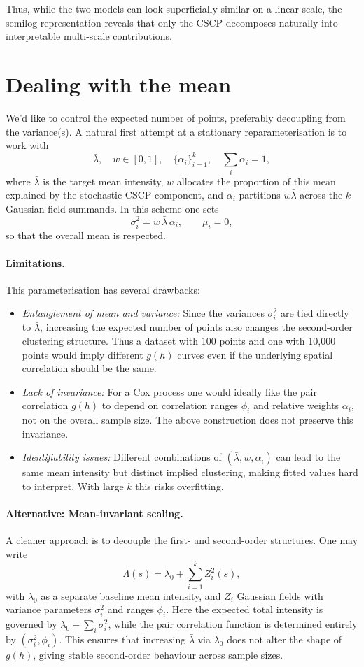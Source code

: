 \documentclass[11pt]{article}
\begin{document}
Thus, while the two models can look superficially similar on a linear scale, the semilog representation reveals that only the CSCP decomposes naturally into interpretable multi-scale contributions.


\section{Dealing with the mean}
We'd like to control the expected number of points, preferably decoupling from the variance(s). A natural first attempt at a stationary reparameterisation is to work with
\[
\bar\lambda, \quad w \in [0,1], \quad \{\alpha_i\}_{i=1}^k, \quad \sum_i \alpha_i = 1,
\]
where $\bar\lambda$ is the target mean intensity, $w$ allocates the proportion of this mean explained by the stochastic CSCP component, and $\alpha_i$ partitions $w\bar\lambda$ across the $k$ Gaussian-field summands.  In this scheme one sets
\[
\sigma_i^2 = w \, \bar\lambda \, \alpha_i, 
\qquad \mu_i = 0,
\]
so that the overall mean is respected.

\paragraph{Limitations.}
This parameterisation has several drawbacks:
\begin{itemize}
	\item \emph{Entanglement of mean and variance:} Since the variances $\sigma_i^2$ are tied directly to $\bar\lambda$, increasing the expected number of points also changes the second-order clustering structure. Thus a dataset with 100 points and one with 10{,}000 points would imply different $g(h)$ curves even if the underlying spatial correlation should be the same.
	\item \emph{Lack of invariance:} For a Cox process one would ideally like the pair correlation $g(h)$ to depend on correlation ranges $\phi_i$ and relative weights $\alpha_i$, not on the overall sample size. The above construction does not preserve this invariance.
	\item \emph{Identifiability issues:} Different combinations of $(\bar\lambda, w, \alpha_i)$ can lead to the same mean intensity but distinct implied clustering, making fitted values hard to interpret. With large $k$ this risks overfitting.
\end{itemize}

\paragraph{Alternative: Mean-invariant scaling.}
A cleaner approach is to decouple the first- and second-order structures. One may write
\[
\Lambda(s) = \lambda_0 + \sum_{i=1}^k Z_i^2(s),
\]
with $\lambda_0$ as a separate baseline mean intensity, and $Z_i$ Gaussian fields with variance parameters $\sigma_i^2$ and ranges $\phi_i$. Here the expected total intensity is governed by $\lambda_0 + \sum_i \sigma_i^2$, while the pair correlation function is determined entirely by $(\sigma_i^2, \phi_i)$. This ensures that increasing $\bar\lambda$ via $\lambda_0$ does not alter the shape of $g(h)$, giving stable second-order behaviour across sample sizes.
\end{document}
